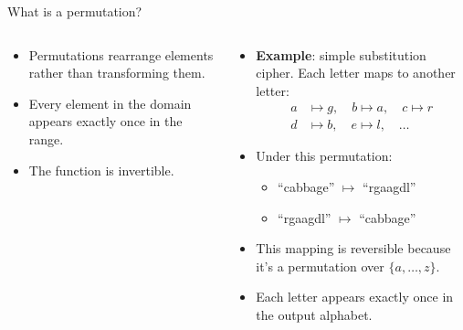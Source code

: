 \documentclass[aspectratio=169, lualatex, handout]{beamer}
\begin{document}
\begin{frame}{What is a permutation?}
	\begin{columns}[c]
		\begin{column}{0.5\textwidth}
			\begin{itemize}
				\item Permutations rearrange elements rather than transforming them.
				\item Every element in the domain appears exactly once in the range.
				\item The function is invertible.
			\end{itemize}
		\end{column}
		\begin{column}{0.5\textwidth}
			\begin{itemize}
				\item \textbf{Example}: simple substitution cipher. Each letter maps to another letter:
				      \begin{align*}
					      a & \mapsto g,\quad b \mapsto a,\quad c \mapsto r \\
					      d & \mapsto b,\quad e \mapsto l,\quad \ldots
				      \end{align*}
				\item Under this permutation:
				      \begin{itemize}
					      \item ``cabbage'' $\mapsto$ ``rgaagdl''
					      \item ``rgaagdl'' $\mapsto$ ``cabbage''
				      \end{itemize}
				\item This mapping is reversible because it's a permutation over $\{a,\ldots,z\}$.
				\item Each letter appears exactly once in the output alphabet.
			\end{itemize}
		\end{column}
	\end{columns}
\end{frame}
\end{document}
